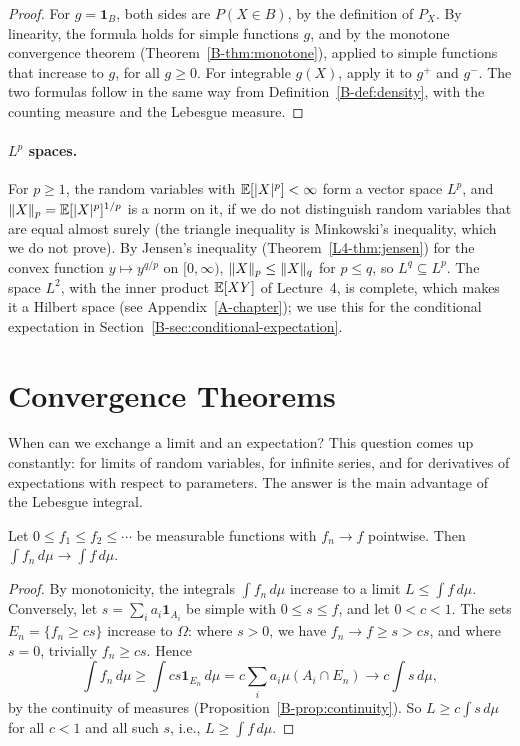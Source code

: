 \begin{proof}
    For $g = \mathbf{1}_B$, both sides are $P(X \in B)$, by the definition of $P_X$. By linearity, the formula holds for simple functions $g$, and by the monotone convergence theorem (Theorem~\ref{B-thm:monotone}), applied to simple functions that increase to $g$, for all $g \geq 0$. For integrable $g(X)$, apply it to $g^+$ and $g^-$. The two formulas follow in the same way from Definition~\ref{B-def:density}, with the counting measure and the Lebesgue measure.
\end{proof}

\paragraph{$L^p$ spaces.} For $p \geq 1$, the random variables with $\mathbb{E}[|X|^p] < \infty$ form a vector space $L^p$, and $\lVert X \rVert_p = \mathbb{E}[|X|^p]^{1/p}$ is a norm on it, if we do not distinguish random variables that are equal almost surely (the triangle inequality is Minkowski's inequality, which we do not prove). By Jensen's inequality (Theorem~\ref{L4-thm:jensen}) for the convex function $y \mapsto y^{q/p}$ on $[0, \infty)$, $\lVert X \rVert_p \leq \lVert X \rVert_q$ for $p \leq q$, so $L^q \subseteq L^p$. The space $L^2$, with the inner product $\mathbb{E}[XY]$ of Lecture~4, is complete, which makes it a Hilbert space (see Appendix~\ref{A-chapter}); we use this for the conditional expectation in Section~\ref{B-sec:conditional-expectation}.

\section{Convergence Theorems}\label{B-sec:convergence-theorems}

When can we exchange a limit and an expectation? This question comes up constantly: for limits of random variables, for infinite series, and for derivatives of expectations with respect to parameters. The answer is the main advantage of the Lebesgue integral.

\begin{theorem}\label{B-thm:monotone}
    Let $0 \leq f_1 \leq f_2 \leq \cdots$ be measurable functions with $f_n \to f$ pointwise. Then $\int f_n\, d\mu \to \int f\, d\mu$.
\end{theorem}

\begin{proof}
    By monotonicity, the integrals $\int f_n\, d\mu$ increase to a limit $L \leq \int f\, d\mu$. Conversely, let $s = \sum_i a_i\mathbf{1}_{A_i}$ be simple with $0 \leq s \leq f$, and let $0 < c < 1$. The sets $E_n = \{f_n \geq cs\}$ increase to $\Omega$: where $s > 0$, we have $f_n \to f \geq s > cs$, and where $s = 0$, trivially $f_n \geq cs$. Hence
    \[\int f_n\, d\mu \geq \int cs\mathbf{1}_{E_n}\, d\mu = c\sum_i a_i\mu(A_i \cap E_n) \to c\int s\, d\mu,\]
    by the continuity of measures (Proposition~\ref{B-prop:continuity}). So $L \geq c\int s\, d\mu$ for all $c < 1$ and all such $s$, i.e., $L \geq \int f\, d\mu$.
\end{proof}

